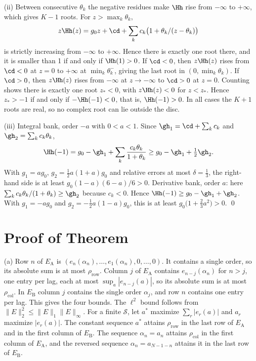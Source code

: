 (ii) Between consecutive $\theta_k$ the negative residues make $\Hh$ rise from $-\infty$ to $+\infty$, which gives $K-1$ roots. For $z>\max_k\theta_k$,
\[
z\Hh(z)=g_0z+\cd+\sum_k c_k\big(1+\theta_k/(z-\theta_k)\big)
\]
is strictly increasing from $-\infty$ to $+\infty$. Hence there is exactly one root there, and it is smaller than 1 if and only if $\Hh(1)>0$. If $\cd<0$, then $z\Hh(z)$ rises from $\cd<0$ at $z=0$ to $+\infty$ at $\min_k\theta_k^-$, giving the last root in $(0,\min_k\theta_k)$. If $\cd>0$, then $z\Hh(z)$ rises from $-\infty$ at $z\to-\infty$ to $\cd>0$ at $z=0$. Counting shows there is exactly one root $z_*<0$, with $z\Hh(z)<0$ for $z<z_*$. Hence $z_*>-1$ if and only if $-\Hh(-1)<0$, that is, $\Hh(-1)>0$. In all cases the $K+1$ roots are real, so no complex root can lie outside the disc.

(iii) Integral bank, order $-a$ with $0<a<1$. Since $\gh_1=\cd+\sum_kc_k$ and $\gh_2=\sum_kc_k\theta_k$,
\[
\Hh(-1)=g_0-\gh_1+\sum_k\frac{c_k\theta_k}{1+\theta_k}\ge g_0-\gh_1+\tfrac12\gh_2 .
\]
With $g_1=ag_0$, $g_2=\tfrac12a(1+a)g_0$ and relative errors at most $\delta=\tfrac13$, the right-hand side is at least $g_0(1-a)(6-a)/6>0$. Derivative bank, order $a$: here $\sum_k c_k\theta_k/(1+\theta_k)\ge\gh_2$ because $c_k<0$. Hence $\Hh(-1)\ge g_0-\gh_1+\gh_2$. With $g_1=-ag_0$ and $g_2=-\tfrac12a(1-a)g_0$, this is at least $g_0\big(1+\tfrac23a^2\big)>0$. \qed

\section{Proof of Theorem~}\label{app:opnorm}

(a) Row $n$ of $E_{\mathrm A}$ is $(e_n(\alpha_n),\dots,e_1(\alpha_n),0,\dots,0)$. It contains a single order, so its absolute sum is at most $\rho_{\mathrm{row}}$. Column $j$ of $E_{\mathrm A}$ contains $e_{n-j}(\alpha_n)$ for $n>j$, one entry per lag, each at most $\sup_a|e_{n-j}(a)|$, so its absolute sum is at most $\rho_{\mathrm{col}}$. In $E_{\mathrm B}$ column $j$ contains the single order $\alpha_j$, and row $n$ contains one entry per lag. This gives the four bounds. The $\ell^2$ bound follows from $\|E\|_2^2\le\|E\|_1\|E\|_\infty$. For a finite $\mathcal S$, let $a^*$ maximize $\sum_r|e_r(a)|$ and $a_r$ maximize $|e_r(a)|$. The constant sequence $a^*$ attains $\rho_{\mathrm{row}}$ in the last row of $E_{\mathrm A}$ and in the first column of $E_{\mathrm B}$. The sequence $\alpha_n=a_n$ attains $\rho_{\mathrm{col}}$ in the first column of $E_{\mathrm A}$, and the reversed sequence $\alpha_n=a_{N-1-n}$ attains it in the last row of $E_{\mathrm B}$.

